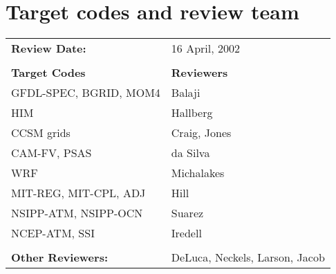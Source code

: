 \section{Target codes and review team}

\begin{tabular}{l l}

{\bf Review Date:}            & 16 April, 2002 \\ \\

{\bf Target Codes}            & {\bf Reviewers} \\
GFDL-SPEC, BGRID, MOM4        & Balaji \\ 
HIM                           & Hallberg \\
CCSM grids                    & Craig, Jones \\
CAM-FV, PSAS                  & da Silva\\
WRF                           & Michalakes \\
MIT-REG, MIT-CPL, ADJ         & Hill \\
NSIPP-ATM, NSIPP-OCN          & Suarez \\
NCEP-ATM, SSI                 & Iredell \\ \\

{\bf Other Reviewers:}        & DeLuca, Neckels, Larson, Jacob

\end{tabular}


%



%

